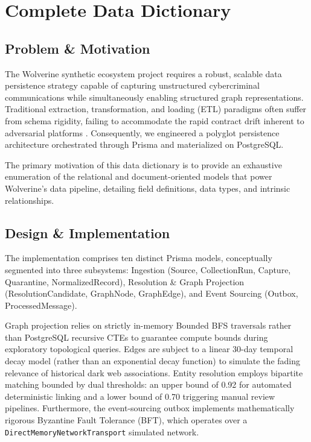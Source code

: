 \chapter{Complete Data Dictionary}
\label{app:data-dictionary}

\section{Problem \& Motivation}
The Wolverine synthetic ecosystem project requires a robust, scalable data persistence strategy capable of capturing unstructured cybercriminal communications while simultaneously enabling structured graph representations. Traditional extraction, transformation, and loading (ETL) paradigms often suffer from schema rigidity, failing to accommodate the rapid contract drift inherent to adversarial platforms \cite{db:stonebraker2005}. Consequently, we engineered a polyglot persistence architecture orchestrated through Prisma and materialized on PostgreSQL. 

The primary motivation of this data dictionary is to provide an exhaustive enumeration of the relational and document-oriented models that power Wolverine's data pipeline, detailing field definitions, data types, and intrinsic relationships.

\section{Design \& Implementation}
The implementation comprises ten distinct Prisma models, conceptually segmented into three subsystems: Ingestion (Source, CollectionRun, Capture, Quarantine, NormalizedRecord), Resolution \& Graph Projection (ResolutionCandidate, GraphNode, GraphEdge), and Event Sourcing (Outbox, ProcessedMessage).

Graph projection relies on strictly in-memory Bounded BFS traversals rather than PostgreSQL recursive CTEs to guarantee compute bounds during exploratory topological queries. Edges are subject to a linear 30-day temporal decay model (rather than an exponential decay function) to simulate the fading relevance of historical dark web associations. Entity resolution employs bipartite matching bounded by dual thresholds: an upper bound of 0.92 for automated deterministic linking and a lower bound of 0.70 triggering manual review pipelines. Furthermore, the event-sourcing outbox implements mathematically rigorous Byzantine Fault Tolerance (BFT), which operates over a \texttt{DirectMemoryNetworkTransport} simulated network.

